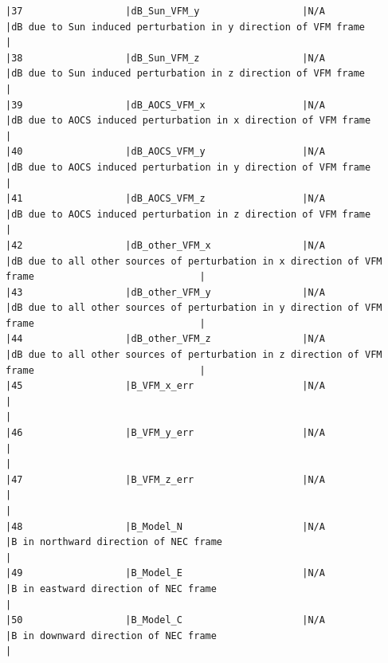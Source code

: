 \begin{verbatim}
|37                  |dB_Sun_VFM_y                  |N/A                           |dB due to Sun induced perturbation in y direction of VFM frame                                      |
|38                  |dB_Sun_VFM_z                  |N/A                           |dB due to Sun induced perturbation in z direction of VFM frame                                      |
|39                  |dB_AOCS_VFM_x                 |N/A                           |dB due to AOCS induced perturbation in x direction of VFM frame                                     |
|40                  |dB_AOCS_VFM_y                 |N/A                           |dB due to AOCS induced perturbation in y direction of VFM frame                                     |
|41                  |dB_AOCS_VFM_z                 |N/A                           |dB due to AOCS induced perturbation in z direction of VFM frame                                     |
|42                  |dB_other_VFM_x                |N/A                           |dB due to all other sources of perturbation in x direction of VFM frame                             |
|43                  |dB_other_VFM_y                |N/A                           |dB due to all other sources of perturbation in y direction of VFM frame                             |
|44                  |dB_other_VFM_z                |N/A                           |dB due to all other sources of perturbation in z direction of VFM frame                             |
|45                  |B_VFM_x_err                   |N/A                           |                                                                                                    |
|46                  |B_VFM_y_err                   |N/A                           |                                                                                                    |
|47                  |B_VFM_z_err                   |N/A                           |                                                                                                    |
|48                  |B_Model_N                     |N/A                           |B in northward direction of NEC frame                                                               |
|49                  |B_Model_E                     |N/A                           |B in eastward direction of NEC frame                                                                |
|50                  |B_Model_C                     |N/A                           |B in downward direction of NEC frame                                                                |

\end{verbatim}
